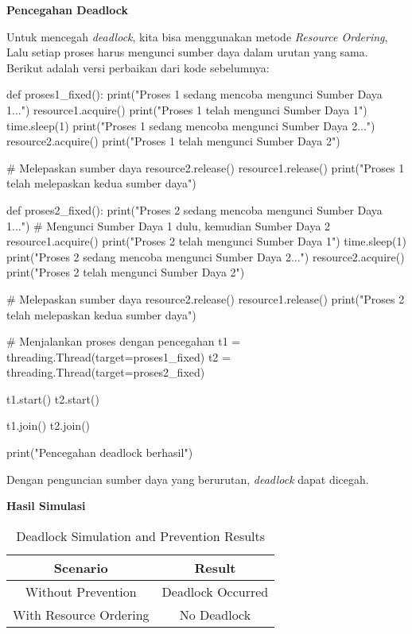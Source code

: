 \documentclass[12pt]{article}
\begin{document}
\textbf{Pencegahan Deadlock}

Untuk mencegah \textit{deadlock}, kita bisa menggunakan metode \textit{Resource Ordering}, Lalu setiap proses harus mengunci sumber daya dalam urutan yang sama. Berikut adalah versi perbaikan dari kode sebelumnya:

\begin{python}
def proses1_fixed():
    print("Proses 1 sedang mencoba mengunci Sumber Daya 1...")
    resource1.acquire()
    print("Proses 1 telah mengunci Sumber Daya 1")
    time.sleep(1)
    print("Proses 1 sedang mencoba mengunci Sumber Daya 2...")
    resource2.acquire()
    print("Proses 1 telah mengunci Sumber Daya 2")
    
    # Melepaskan sumber daya
    resource2.release()
    resource1.release()
    print("Proses 1 telah melepaskan kedua sumber daya")

def proses2_fixed():
    print("Proses 2 sedang mencoba mengunci Sumber Daya 1...")  # Mengunci Sumber Daya 1 dulu, kemudian Sumber Daya 2
    resource1.acquire()
    print("Proses 2 telah mengunci Sumber Daya 1")
    time.sleep(1)
    print("Proses 2 sedang mencoba mengunci Sumber Daya 2...")
    resource2.acquire()
    print("Proses 2 telah mengunci Sumber Daya 2")
    
    # Melepaskan sumber daya
    resource2.release()
    resource1.release()
    print("Proses 2 telah melepaskan kedua sumber daya")

# Menjalankan proses dengan pencegahan
t1 = threading.Thread(target=proses1_fixed)
t2 = threading.Thread(target=proses2_fixed)

t1.start()
t2.start()

t1.join()
t2.join()

print("Pencegahan deadlock berhasil")
\end{python}

Dengan penguncian sumber daya yang berurutan, \textit{deadlock} dapat dicegah.

\textbf{Hasil Simulasi}

\begin{table}[htbp]
    \centering
    \begin{tabular}{|c|c|}
    \hline
    \textbf{Scenario} & \textbf{Result} \\
    \hline
    Without Prevention & Deadlock Occurred \\
    \hline
    With Resource Ordering & No Deadlock \\
    \hline
    \end{tabular}
    \caption{Deadlock Simulation and Prevention Results}
    \label{tab:deadlock}
\end{table}
\end{document}
